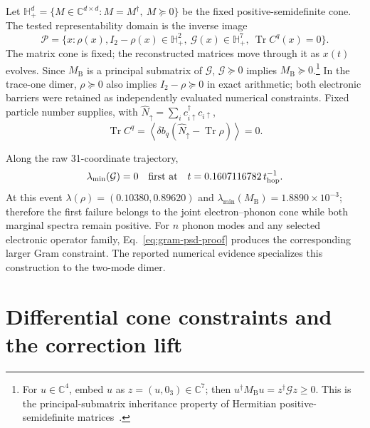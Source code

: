 \documentclass[10pt,twocolumn]{article}
\newcommand{\C}{\mathbb C}
\newcommand{\I}{I}
\newcommand{\Tr}{\operatorname{Tr}}
\newcommand{\MB}{M_{\mathrm B}}
\begin{document}
Let $\mathbb H_+^d=\{M\in\C^{d\times d}:M=M^\dagger,\ M\succeq0\}$ be the
fixed positive-semidefinite cone.  The tested representability domain is the
inverse image
\begin{equation}
\mathcal P=\{x:\rho(x),\I_2-\rho(x)\in\mathbb H_+^2,
\ \mathcal G(x)\in\mathbb H_+^7,
\ \Tr C^q(x)=0\}.
\label{eq:physical-domain}
\end{equation}
The matrix cone is fixed; the reconstructed matrices move through it as
$x(t)$ evolves.  Since $\MB$ is a principal submatrix of $\mathcal G$,
$\mathcal G\succeq0$ implies $\MB\succeq0$.\footnote{For
$u\in\C^4$, embed $u$ as $z=(u,0_3)\in\C^7$; then
$u^\dagger\MB u=z^\dagger\mathcal Gz\geq0$.  This is the
principal-submatrix inheritance property of Hermitian positive-semidefinite
matrices~\cite{hornJohnson2012}.}
In the trace-one dimer,
$\rho\succeq0$ also implies $\I_2-\rho\succeq0$ in exact arithmetic; both
electronic barriers were retained as independently evaluated numerical
constraints.  Fixed particle number supplies, with
$\widehat N_\uparrow=\sum_i c_{i\uparrow}^\dagger c_{i\uparrow}$,
\begin{equation}
\Tr C^q=\left\langle\delta b_q
\left(\widehat N_\uparrow-\Tr\rho\right)\right\rangle=0.
\label{eq:c-trace}
\end{equation}

Along the raw 31-coordinate trajectory,
\begin{equation}
\lambda_{\min}(\mathcal G)=0
\quad\text{first at}\quad
t=0.1607116782\,t_{\rm hop}^{-1}.
\label{eq:first-joint-crossing}
\end{equation}
At this event $\lambda(\rho)=(0.10380,0.89620)$ and
$\lambda_{\min}(\MB)=1.8890\times10^{-3}$; therefore the first failure
belongs to the joint electron--phonon cone while both marginal spectra remain
positive.  For $n$ phonon modes and any selected electronic operator family,
Eq.~\eqref{eq:gram-psd-proof} produces the corresponding larger Gram
constraint.  The reported numerical evidence specializes this construction
to the two-mode dimer.

\section{Differential cone constraints and the correction lift}
\end{document}
